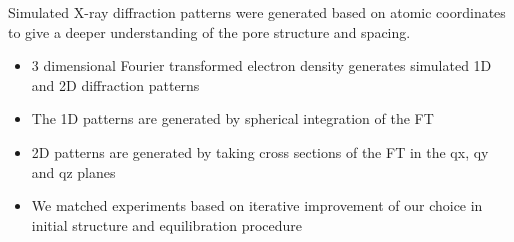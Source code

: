 \documentclass{article}
\begin{document}
	Simulated X-ray diffraction patterns were generated based on atomic coordinates to give a deeper understanding of the pore structure and spacing. 
        \begin{itemize}
               \item 3 dimensional Fourier transformed electron density generates simulated 1D and 2D diffraction patterns
               \item The 1D patterns are generated by spherical integration of the FT
               \item 2D patterns are generated by taking cross sections of the FT in the qx, qy and qz planes
               \item We matched experiments based on iterative improvement of our choice in initial structure and equilibration procedure
        \end{itemize}
\end{document}

